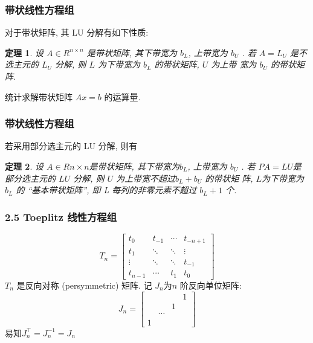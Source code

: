 \documentclass[notheorems,serif]{beamer}
\newcommand{\hei}[1]{{\HEI#1}}
\newtheorem{theorem}{\hei{定理}}
\begin{document}
\begin{frame}
\frametitle{带状线性方程组}
对于带状矩阵, 其 LU 分解有如下性质:

\begin{theorem}
	设 $A ∈ R^{n×n}$ 是带状矩阵, 其下带宽为 $b_L$, 上带宽为 $b_U$ . 若 $A =
	L_U$ 是不选主元的 $L_U$ 分解, 则 $L$ 为下带宽为 $b_L$ 的带状矩阵, $U$ 为上带
	宽为 $b_U$ 的带状矩阵.	
\end{theorem}

统计求解带状矩阵 $Ax = b$ 的运算量.
\end{frame}

\begin{frame}
\frametitle{带状线性方程组}
若采用部分选主元的 LU 分解, 则有

\begin{theorem}
	设 $A ∈ R
	n×n $是带状矩阵, 其下带宽为$ b_L$, 上带宽为 $b_U$ . 若 $P A =
	LU $是部分选主元的 $LU$ 分解, 则 $U$ 为上带宽不超过$b_L + b_U$ 的带状矩
	阵, $L $为下带宽为 $b_L$ 的 “基本带状矩阵”, 即 L 每列的非零元素不超过
	$b_L + 1$ 个.
\end{theorem}
\end{frame}

\begin{frame}
\frametitle{2.5 \quad Toeplitz 线性方程组}
\begin{equation}
T_{n}=\left[\begin{array}{cccc}{t_{0}} & {t_{-1}} & {\cdots} & {t_{-n+1}} \\ {t_{1}} & {\ddots} & {\ddots} & {\vdots} \\ {\vdots} & {\ddots} & {\ddots} & {t_{-1}} \\ {t_{n-1}} & {\cdots} & {t_{1}} & {t_{0}}\end{array}\right]
\end{equation}
$T_n$ 是反向对称 (persymmetric) 矩阵. 记 $J_n $为$ n$ 阶反向单位矩阵:
\begin{equation}
J_{n}=\left[\begin{array}{cccc}{ } & { } & { } &{1} \\{ } & { } &{1} & { } \\ {} & {\cdots}& { } & { } \\ {1} &{ } &{ } &{ }\end{array}\right]
\end{equation}
易知$J_{n}^{\top}=J_{n}^{-1}=J_{n}$
\end{frame}
\end{document}
